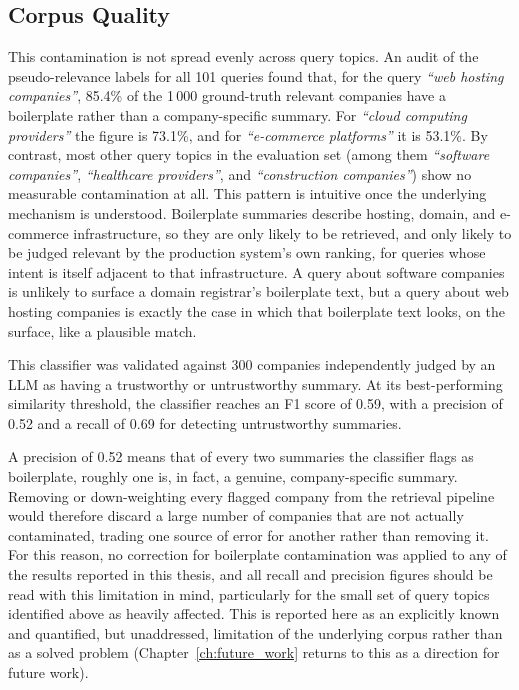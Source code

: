 \documentclass[a4paper,oneside,bibliography=totoc]{scrbook}
\begin{document}
\subsection{Corpus Quality}
\label{sec:trust_filter_result}

This contamination is not spread evenly across query topics. An audit of the pseudo-relevance labels for all 101 queries found that, for the query \textit{``web hosting companies''}, 85.4\% of the 1\,000 ground-truth relevant companies have a boilerplate rather than a company-specific summary. For \textit{``cloud computing providers''} the figure is 73.1\%, and for \textit{``e-commerce platforms''} it is 53.1\%. By contrast, most other query topics in the evaluation set (among them \textit{``software companies''}, \textit{``healthcare providers''}, and \textit{``construction companies''}) show no measurable contamination at all. This pattern is intuitive once the underlying mechanism is understood. Boilerplate summaries describe hosting, domain, and e-commerce infrastructure, so they are only likely to be retrieved, and only likely to be judged relevant by the production system's own ranking, for queries whose intent is itself adjacent to that infrastructure. A query about software companies is unlikely to surface a domain registrar's boilerplate text, but a query about web hosting companies is exactly the case in which that boilerplate text looks, on the surface, like a plausible match.

This classifier was validated against 300 companies independently judged by an LLM as having a trustworthy or untrustworthy summary. At its best-performing similarity threshold, the classifier reaches an F1 score of 0.59, with a precision of 0.52 and a recall of 0.69 for detecting untrustworthy summaries.

A precision of 0.52 means that of every two summaries the classifier flags as boilerplate, roughly one is, in fact, a genuine, company-specific summary. Removing or down-weighting every flagged company from the retrieval pipeline would therefore discard a large number of companies that are not actually contaminated, trading one source of error for another rather than removing it. For this reason, no correction for boilerplate contamination was applied to any of the results reported in this thesis, and all recall and precision figures should be read with this limitation in mind, particularly for the small set of query topics identified above as heavily affected. This is reported here as an explicitly known and quantified, but unaddressed, limitation of the underlying corpus rather than as a solved problem (Chapter~\ref{ch:future_work} returns to this as a direction for future work).
\end{document}
